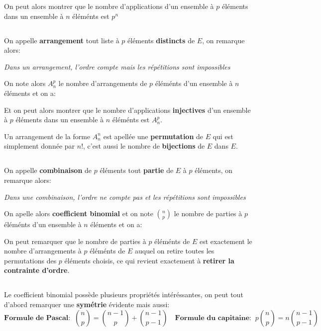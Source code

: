 On peut alors montrer que le nombre d'applications d'un ensemble à \(p\) éléments dans un ensemble à \(n\) éléménts est \(p^n\)

\subsection*{}
On appelle \textbf{arrangement} tout liste à \(p\) éléments \textbf{distincts} de \(E\), on remarque alors:
\begin{center}
   \textit{
      Dans un arrangement, l'ordre compte mais les répétitions sont impossibles
   }
\end{center}
On note alors \(A_n^p\) le nombre d'arrangements de \(p\) éléménts d'un ensemble à \(n\) éléments et on a:

Et on peut alors montrer que le nombre d'applications \textbf{injectives} d'un ensemble à \(p\) éléments dans un ensemble à \(n\) éléménts est \(A_n^p\).\<

Un arrangement de la forme \(A_n^n\) est apellée une \textbf{permutation} de \(E\) qui est simplement donnée par \(n!\), c'est aussi le nombre de \textbf{bijections} de \(E\) dans \(E\).

\subsection*{}
On appelle \textbf{combinaison} de \(p\) éléments tout \textbf{partie} de \(E\) à \(p\) éléments, on remarque alors:
\begin{center}
   \textit{
      Dans une combinaison, l'ordre ne compte pas et les répétitions sont impossibles
   }
\end{center}
On apelle alors \textbf{coefficient binomial} et on note \(\binom{n}{p}\) le nombre de parties à \(p\) éléménts d'un ensemble à \(n\) éléments et on a:

On peut remarquer que le nombre de parties à \(p\) éléménts de \(E\) est exactement le nombre d'arrangements à \(p\) éléménts de \(E\) auquel on retire toutes les permutations des \(p\) éléments choisis, ce qui revient exactement à \textbf{retirer la contrainte d'ordre}.

\subsection*{}
Le coefficient binomial possède plusieurs propriétés intéréssantes, on peut tout d'abord remarquer une \textbf{symétrie} évidente mais aussi:
\[
   \textbf{Formule de Pascal:} \;\; \binom{n}{p} = \binom{n - 1}{p} + \binom{n - 1}{p - 1}\quad      
   \textbf{Formule du capitaine:} \;\; p\binom{n}{p} = n\binom{n - 1}{p - 1} \;\;
\]

